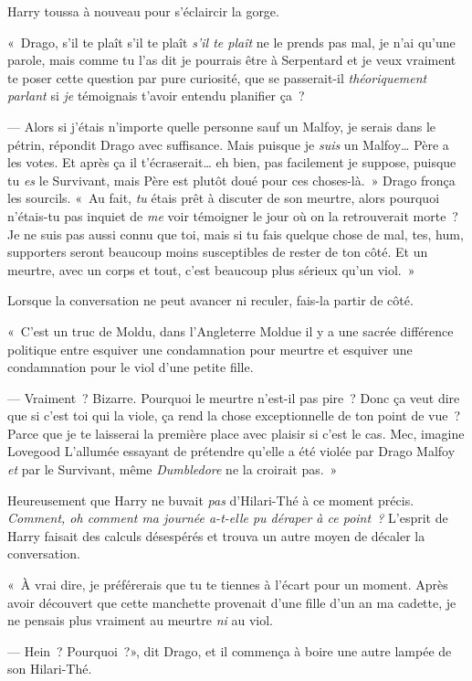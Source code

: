 Harry toussa à nouveau pour s'éclaircir la gorge.

«~Drago, s'il te plaît s'il te plaît \emph{s'il te plaît} ne le prends pas mal, je n'ai qu'une parole, mais comme tu l'as dit je pourrais être à Serpentard et je veux vraiment te poser cette question par pure curiosité, que se passerait-il \emph{théoriquement parlant} si \emph{je} témoignais t'avoir entendu planifier ça~?

--- Alors si j'étais n'importe quelle personne sauf un Malfoy, je serais dans le pétrin, répondit Drago avec suffisance. Mais puisque je \emph{suis} un Malfoy… Père a les votes. Et après ça il t'écraserait… eh bien, pas facilement je suppose, puisque tu \emph{es} le Survivant, mais Père est plutôt doué pour ces choses-là.~» Drago fronça les sourcils. «~Au fait, \emph{tu} étais prêt à discuter de son meurtre, alors pourquoi n'étais-tu pas inquiet de \emph{me} voir témoigner le jour où on la retrouverait morte~? Je ne suis pas aussi connu que toi, mais si tu fais quelque chose de mal, tes, hum, supporters seront beaucoup moins susceptibles de rester de ton côté. Et un meurtre, avec un corps et tout, c'est beaucoup plus sérieux qu'un viol.~»

Lorsque la conversation ne peut avancer ni reculer, fais-la partir de côté.

«~C'est un truc de Moldu, dans l'Angleterre Moldue il y a une sacrée différence politique entre esquiver une condamnation pour meurtre et esquiver une condamnation pour le viol d'une petite fille.

--- Vraiment~? Bizarre. Pourquoi le meurtre n'est-il pas pire~? Donc ça veut dire que si c'est toi qui la viole, ça rend la chose exceptionnelle de ton point de vue~? Parce que je te laisserai la première place avec plaisir si c'est le cas. Mec, imagine Lovegood L'allumée essayant de prétendre qu'elle a été violée par Drago Malfoy \emph{et} par le Survivant, même \emph{Dumbledore} ne la croirait pas.~»

Heureusement que Harry ne buvait \emph{pas} d'Hilari-Thé à ce moment précis. \emph{Comment, oh comment ma journée a-t-elle pu déraper à ce point~?} L'esprit de Harry faisait des calculs désespérés et trouva un autre moyen de décaler la conversation.

«~À vrai dire, je préférerais que tu te tiennes à l'écart pour un moment. Après avoir découvert que cette manchette provenait d'une fille d'un an ma cadette, je ne pensais plus vraiment au meurtre \emph{ni} au viol.

--- Hein~? Pourquoi~?», dit Drago, et il commença à boire une autre lampée de son Hilari-Thé.

